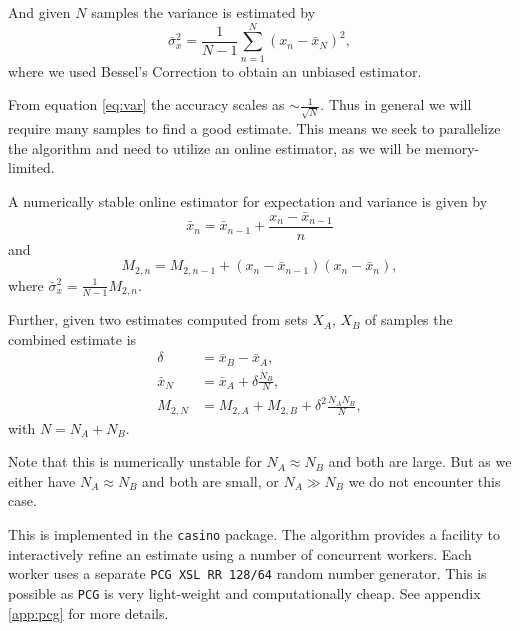 \documentclass[10pt, a4paper]{article}
\begin{document}
  And given $N$ \iid{} samples the variance is estimated by
  \begin{equation}
  \bar{\sigma}_x^2 = \frac{1}{N-1} \sum_{n=1}^N (x_n - \bar{x}_N)^2,
  \end{equation}
  where we used Bessel's Correction\cite{nr} to obtain an unbiased estimator.

  From equation \ref{eq:var} the accuracy scales as $\sim \frac{1}{\sqrt{N}}$. Thus in general we will
  require many samples to find a good estimate. This means we seek to parallelize the algorithm and need
  to utilize an online estimator, as we will be memory-limited\footnotemark.


  A numerically stable online estimator for expectation and variance is given by
  \begin{equation}
  \bar{x}_n = \bar{x}_{n-1} + \frac{x_n - \bar{x}_{n-1}}{n}
  \end{equation}
  and
  \begin{equation}
  M_{2,n} = M_{2,n-1} + (x_n - \bar{x}_{n-1})(x_n - \bar{x}_n),
  \end{equation}
  where $\bar{\sigma}_x^2 = \frac{1}{N-1} M_{2,n}$\cite{welford}.

  Further, given two estimates computed from sets $X_A$, $X_B$ of \iid{} samples the combined
  estimate is
  \begin{equation}
  \begin{split}
  \delta & = \bar{x}_B - \bar{x}_A, \\
  \bar{x}_N & = \bar{x}_A + \delta \frac{N_B}{N}, \\
  M_{2,N} & = M_{2,A} + M_{2,B} + \delta^2 \frac{N_A N_B}{N},
  \end{split}
  \end{equation}
  with $N = N_A + N_B$\cite{chan}.

  Note that this is numerically unstable for $N_A \approx N_B$ and both are large\cite{chan}. But as we
  either have $N_A \approx N_B$ and both are small, or $N_A \gg N_B$ we do not encounter this case.

  This is implemented in the \texttt{casino} package. The algorithm provides a facility to interactively
  refine an estimate using a number of concurrent workers. Each worker uses a separate \texttt{PCG XSL RR 128/64}
  random number generator. This is possible as \texttt{PCG} is very light-weight and computationally cheap\cite{pcg}.
  See appendix \ref{app:pcg} for more details.
\end{document}
